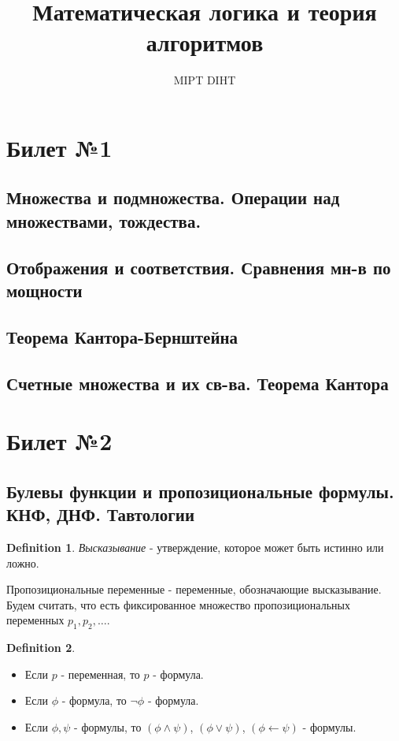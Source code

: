 \documentclass[a4paper]{article}
\title{Математическая логика и теория алгоритмов}
\author{MIPT DIHT}
\theoremstyle{plain}
\theoremstyle{remark}
\theoremstyle{definition}
\newtheorem{definition}{Definition}
\begin{document}
\maketitle

\section{Билет №1}
\subsection{Множества и подмножества. Операции над множествами, тождества.}
\subsection{Отображения и соответствия. Сравнения мн-в по мощности}
\subsection{Теорема Кантора-Бернштейна}
\subsection{Счетные множества и их св-ва. Теорема Кантора}

\section{Билет №2}


\subsection{Булевы функции и пропозициональные формулы. КНФ, ДНФ. Тавтологии}
\begin{definition}
	\emph{Высказывание} - утверждение, которое может быть истинно или ложно.
\end{definition}
Пропозициональные переменные - переменные, обозначающие высказывание.
Будем считать, что есть фиксированное множество пропозициональных переменных $p_1, p_2, \ldots$.
\begin{definition}

	\begin{itemize}
		\item Если $p$ - переменная, то $p$ - формула.
		\item Если $\phi$ - формула, то $\lnot \phi$ - формула.
		\item Если $\phi, \psi$ - формулы, то $(\phi \land \psi)$, $(\phi \lor \psi)$, $(\phi \leftarrow \psi)$ - формулы.
	\end{itemize}
\end{definition}
\end{document}
